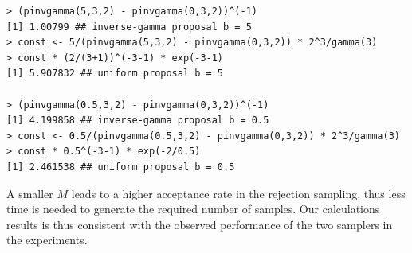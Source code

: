 \begin{lstlisting}
> (pinvgamma(5,3,2) - pinvgamma(0,3,2))^(-1)
[1] 1.00799 ## inverse-gamma proposal b = 5
> const <- 5/(pinvgamma(5,3,2) - pinvgamma(0,3,2)) * 2^3/gamma(3)
> const * (2/(3+1))^(-3-1) * exp(-3-1)
[1] 5.907832 ## uniform proposal b = 5

> (pinvgamma(0.5,3,2) - pinvgamma(0,3,2))^(-1)
[1] 4.199858 ## inverse-gamma proposal b = 0.5
> const <- 0.5/(pinvgamma(0.5,3,2) - pinvgamma(0,3,2)) * 2^3/gamma(3)
> const * 0.5^(-3-1) * exp(-2/0.5)
[1] 2.461538 ## uniform proposal b = 0.5
\end{lstlisting}
A smaller \(M\) leads to a higher acceptance rate in the rejection sampling, thus less time is needed to generate the required number of samples. Our calculations results is thus consistent with the observed performance of the two samplers in the experiments.